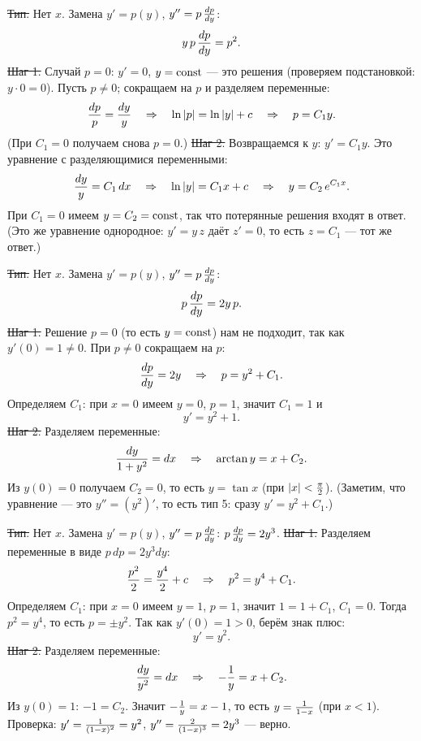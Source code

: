 \st{Тип.} Нет $x$. Замена $y'=p(y)$, $y''=p\,{dp\over dy}$:
$$y\,p\,{dp\over dy}=p^2.$$
\st{Шаг 1.} Случай $p=0$: $y'=0$, $y=\hbox{const}$ --- это решения (проверяем
подстановкой: $y\cdot0=0$). Пусть $p\ne0$; сокращаем на $p$ и разделяем
переменные:
$${dp\over p}={dy\over y}\quad\Rightarrow\quad\ln|p|=\ln|y|+c
\quad\Rightarrow\quad p=C_1y.$$
(При $C_1=0$ получаем снова $p=0$.)
\st{Шаг 2.} Возвращаемся к $y$: $y'=C_1y$. Это уравнение с разделяющимися
переменными:
$${dy\over y}=C_1\,dx\quad\Rightarrow\quad\ln|y|=C_1x+c
\quad\Rightarrow\quad y=C_2\,e^{C_1x}.$$
При $C_1=0$ имеем $y=C_2=\hbox{const}$, так что потерянные решения
входят в ответ.
\smallskip
(Это же уравнение однородное: $y'=y\,z$ даёт $z'=0$, то есть $z=C_1$ --- тот же
ответ.)

\st{Тип.} Нет $x$. Замена $y'=p(y)$, $y''=p\,{dp\over dy}$:
$$p\,{dp\over dy}=2y\,p.$$
\st{Шаг 1.} Решение $p=0$ (то есть $y=\hbox{const}$) нам не подходит,
так как $y'(0)=1\ne0$. При $p\ne0$ сокращаем на $p$:
$${dp\over dy}=2y\quad\Rightarrow\quad p=y^2+C_1.$$
Определяем $C_1$: при $x=0$ имеем $y=0$, $p=1$, значит $C_1=1$ и
$$y'=y^2+1.$$
\st{Шаг 2.} Разделяем переменные:
$${dy\over1+y^2}=dx\quad\Rightarrow\quad\arctan y=x+C_2.$$
Из $y(0)=0$ получаем $C_2=0$, то есть $y=\tan x$ (при $|x|<{\pi\over2}$).
\smallskip
(Заметим, что уравнение --- это $y''=(y^2)'$, то есть тип 5: сразу
$y'=y^2+C_1$.)

\st{Тип.} Нет $x$. Замена $y'=p(y)$, $y''=p\,{dp\over dy}$:
$p\,{dp\over dy}=2y^3$.
\st{Шаг 1.} Разделяем переменные в виде $p\,dp=2y^3dy$:
$${p^2\over2}={y^4\over2}+c\quad\Rightarrow\quad p^2=y^4+C_1.$$
Определяем $C_1$: при $x=0$ имеем $y=1$, $p=1$, значит
$1=1+C_1$, $C_1=0$. Тогда $p^2=y^4$, то есть $p=\pm y^2$. Так как
$y'(0)=1>0$, берём знак плюс:
$$y'=y^2.$$
\st{Шаг 2.} Разделяем переменные:
$${dy\over y^2}=dx\quad\Rightarrow\quad-{1\over y}=x+C_2.$$
Из $y(0)=1$: $-1=C_2$. Значит $-{1\over y}=x-1$, то есть $y={1\over1-x}$
(при $x<1$).
\smallskip
Проверка: $y'={1\over(1-x)^2}=y^2$, $y''={2\over(1-x)^3}=2y^3$ --- верно.

